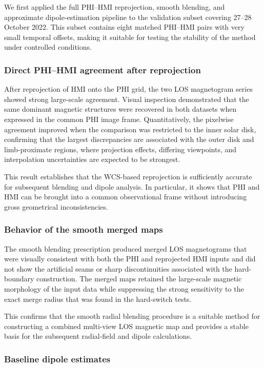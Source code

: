 \documentclass[namedreferences,hyperref,optionalrh]{spr-sola}
\begin{document}
We first applied the full PHI--HMI reprojection, smooth blending, and approximate dipole-estimation pipeline to the validation subset covering 27--28 October 2022. This subset contains eight matched PHI--HMI pairs with very small temporal offsets, making it suitable for testing the stability of the method under controlled conditions.

\subsubsection{Direct PHI--HMI agreement after reprojection}

After reprojection of HMI onto the PHI grid, the two LOS magnetogram series showed strong large-scale agreement. Visual inspection demonstrated that the same dominant magnetic structures were recovered in both datasets when expressed in the common PHI image frame. Quantitatively, the pixelwise agreement improved when the comparison was restricted to the inner solar disk, confirming that the largest discrepancies are associated with the outer disk and limb-proximate regions, where projection effects, differing viewpoints, and interpolation uncertainties are expected to be strongest.

This result establishes that the WCS-based reprojection is sufficiently accurate for subsequent blending and dipole analysis. In particular, it shows that PHI and HMI can be brought into a common observational frame without introducing gross geometrical inconsistencies.

\subsubsection{Behavior of the smooth merged maps}

The smooth blending prescription produced merged LOS magnetograms that were visually consistent with both the PHI and reprojected HMI inputs and did not show the artificial seams or sharp discontinuities associated with the hard-boundary construction. The merged maps retained the large-scale magnetic morphology of the input data while suppressing the strong sensitivity to the exact merge radius that was found in the hard-switch tests.

This confirms that the smooth radial blending procedure is a suitable method for constructing a combined multi-view LOS magnetic map and provides a stable basis for the subsequent radial-field and dipole calculations.

\subsubsection{Baseline dipole estimates}
\end{document}
